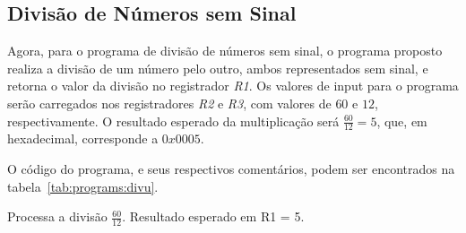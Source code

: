 \documentclass[12pt]{article}
\begin{document}
\subsection{Divisão de Números sem Sinal}\label{sec:programs:divu}

Agora, para o programa de divisão de números sem sinal, o programa proposto
realiza a divisão de um número pelo outro, ambos representados sem sinal, e
retorna o valor da divisão no registrador \emph{R1}. Os valores de input para o
programa serão carregados nos registradores \emph{R2} e \emph{R3}, com valores
de $60$ e $12$, respectivamente. O resultado esperado da multiplicação será
$\frac{60}{12} = 5$, que, em hexadecimal, corresponde a $0x0005$.

O código do programa, e seus respectivos comentários, podem ser encontrados na
tabela~\ref{tab:programs:divu}.

Processa a divisão $\frac{60}{12}$. Resultado esperado em R1 = 5.
\end{document}
